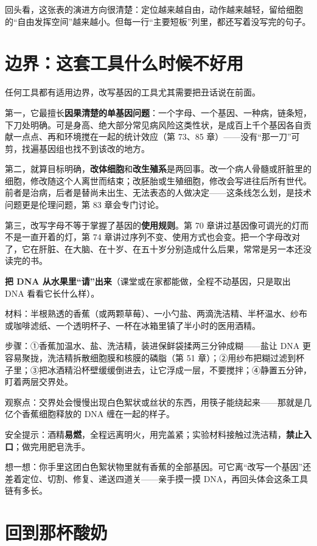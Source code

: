 回头看，这张表的演进方向很清楚：定位越来越自由，动作越来越轻，留给细胞的“自由发挥空间”越来越小。但每一行“主要短板”列里，都还写着没写完的句子。

\section{边界：这套工具什么时候不好用}

任何工具都有适用边界，改写基因的工具尤其需要把丑话说在前面。

第一，它最擅长\textbf{因果清楚的单基因问题}：一个字母、一个基因、一种病，链条短，下刀处明确。可是身高、绝大部分常见病风险这类性状，是成百上千个基因各自贡献一点点、再和环境搅在一起的统计效应（第 73、85 章）——没有“那一刀”可剪，找遍基因组也找不到该改的地方。

第二，就算目标明确，\textbf{改体细胞}和\textbf{改生殖系}是两回事。改一个病人骨髓或肝脏里的细胞，修改随这个人离世而结束；改胚胎或生殖细胞，修改会写进往后所有世代。前者是治病，后者是替尚未出生、无法表态的人做决定——这条线怎么划，是技术问题更是伦理问题，第 83 章会专门讨论。

第三，改写字母不等于掌握了基因的\textbf{使用规则}。第 70 章讲过基因像可调光的灯而不是一直开着的灯，第 74 章讲过序列不变、使用方式也会变。把一个字母改对了，它在肝脏、在大脑、在十岁、在五十岁分别造成什么后果，常常是另一本还没读完的书。

\begin{shiyan}
\textbf{把 DNA 从水果里“请”出来}（课堂或在家都能做，全程不动基因，只是取出 DNA 看看它长什么样）。

材料：半根熟透的香蕉（或两颗草莓）、一小勺盐、两滴洗洁精、半杯温水、纱布或咖啡滤纸、一个透明杯子、一杯在冰箱里镇了半小时的医用酒精。

步骤：①香蕉加温水、盐、洗洁精，装进保鲜袋揉两三分钟成糊——盐让 DNA 更容易聚拢，洗洁精拆散细胞膜和核膜的磷脂（第 51 章）；②用纱布把糊过滤到杯子里；③把冰酒精沿杯壁缓缓倒进去，让它浮成一层，不要搅拌；④静置五分钟，盯着两层交界处。

观察点：交界处会慢慢出现白色絮状或丝状的东西，用筷子能绕起来——那就是几亿个香蕉细胞释放的 DNA 缠在一起的样子。

安全提示：酒精\textbf{易燃}，全程远离明火，用完盖紧；实验材料接触过洗洁精，\textbf{禁止入口}；做完用肥皂洗手。

想一想：你手里这团白色絮状物里就有香蕉的全部基因。可它离“改写一个基因”还差着定位、切割、修复、递送四道关——亲手摸一摸 DNA，再回头体会这条工具链有多长。
\end{shiyan}

\section{回到那杯酸奶}


